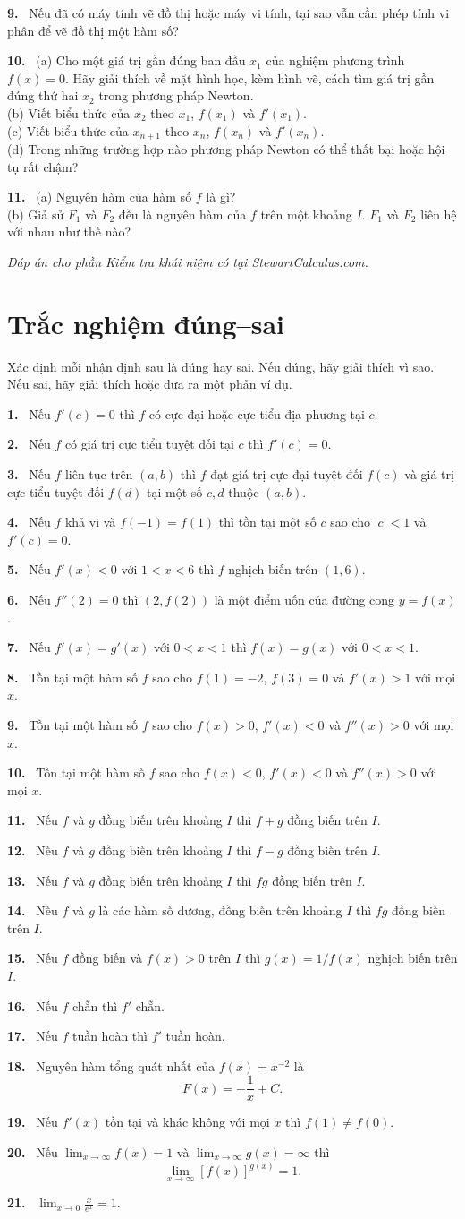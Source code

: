 \documentclass[12pt,a4paper]{article}
\newcommand{\bt}[1]{\par\smallskip\Needspace{5\baselineskip}\noindent\textbf{#1.}\ }
\newcommand{\cc}[1]{\bt{#1}}
\newcommand{\tf}[1]{\bt{#1}}
\begin{document}
\cc{9} Nếu đã có máy tính vẽ đồ thị hoặc máy vi tính, tại sao vẫn cần phép tính vi phân để vẽ đồ thị một hàm số?
\cc{10} (a) Cho một giá trị gần đúng ban đầu $x_1$ của nghiệm phương trình $f(x)=0$. Hãy giải thích về mặt hình học, kèm hình vẽ, cách tìm giá trị gần đúng thứ hai $x_2$ trong phương pháp Newton.\\(b) Viết biểu thức của $x_2$ theo $x_1$, $f(x_1)$ và $f'(x_1)$.\\(c) Viết biểu thức của $x_{n+1}$ theo $x_n$, $f(x_n)$ và $f'(x_n)$.\\(d) Trong những trường hợp nào phương pháp Newton có thể thất bại hoặc hội tụ rất chậm?
\cc{11} (a) Nguyên hàm của hàm số $f$ là gì?\\(b) Giả sử $F_1$ và $F_2$ đều là nguyên hàm của $f$ trên một khoảng $I$. $F_1$ và $F_2$ liên hệ với nhau như thế nào?
\par\textit{Đáp án cho phần Kiểm tra khái niệm có tại StewartCalculus.com.}
\section*{Trắc nghiệm đúng–sai}
Xác định mỗi nhận định sau là đúng hay sai. Nếu đúng, hãy giải thích vì sao. Nếu sai, hãy giải thích hoặc đưa ra một phản ví dụ.
\tf{1} Nếu $f'(c)=0$ thì $f$ có cực đại hoặc cực tiểu địa phương tại $c$.
\tf{2} Nếu $f$ có giá trị cực tiểu tuyệt đối tại $c$ thì $f'(c)=0$.
\tf{3} Nếu $f$ liên tục trên $(a,b)$ thì $f$ đạt giá trị cực đại tuyệt đối $f(c)$ và giá trị cực tiểu tuyệt đối $f(d)$ tại một số $c,d$ thuộc $(a,b)$.
\tf{4} Nếu $f$ khả vi và $f(-1)=f(1)$ thì tồn tại một số $c$ sao cho $|c|<1$ và $f'(c)=0$.
\tf{5} Nếu $f'(x)<0$ với $1<x<6$ thì $f$ nghịch biến trên $(1,6)$.
\tf{6} Nếu $f''(2)=0$ thì $(2,f(2))$ là một điểm uốn của đường cong $y=f(x)$.
\tf{7} Nếu $f'(x)=g'(x)$ với $0<x<1$ thì $f(x)=g(x)$ với $0<x<1$.
\tf{8} Tồn tại một hàm số $f$ sao cho $f(1)=-2$, $f(3)=0$ và $f'(x)>1$ với mọi $x$.
\tf{9} Tồn tại một hàm số $f$ sao cho $f(x)>0$, $f'(x)<0$ và $f''(x)>0$ với mọi $x$.
\tf{10} Tồn tại một hàm số $f$ sao cho $f(x)<0$, $f'(x)<0$ và $f''(x)>0$ với mọi $x$.
\tf{11} Nếu $f$ và $g$ đồng biến trên khoảng $I$ thì $f+g$ đồng biến trên $I$.
\tf{12} Nếu $f$ và $g$ đồng biến trên khoảng $I$ thì $f-g$ đồng biến trên $I$.
\tf{13} Nếu $f$ và $g$ đồng biến trên khoảng $I$ thì $fg$ đồng biến trên $I$.
\tf{14} Nếu $f$ và $g$ là các hàm số dương, đồng biến trên khoảng $I$ thì $fg$ đồng biến trên $I$.
\tf{15} Nếu $f$ đồng biến và $f(x)>0$ trên $I$ thì $g(x)=1/f(x)$ nghịch biến trên $I$.
\tf{16} Nếu $f$ chẵn thì $f'$ chẵn.
\tf{17} Nếu $f$ tuần hoàn thì $f'$ tuần hoàn.
\tf{18} Nguyên hàm tổng quát nhất của $f(x)=x^{-2}$ là
\[F(x)=-\frac1x+C.\]
\tf{19} Nếu $f'(x)$ tồn tại và khác không với mọi $x$ thì $f(1)\ne f(0)$.
\tf{20} Nếu $\lim_{x\to\infty}f(x)=1$ và $\lim_{x\to\infty}g(x)=\infty$ thì
\[\lim_{x\to\infty}[f(x)]^{g(x)}=1.\]
\tf{21} $\displaystyle\lim_{x\to0}\frac{x}{e^x}=1$.
\end{document}

